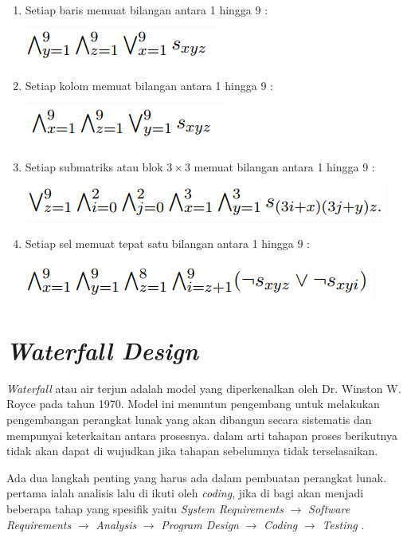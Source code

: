 \begin{enumerate}
	\item Setiap baris memuat bilangan antara 1 
	hingga 9 : 
	
	\includegraphics[scale=1]{gambar/rule1}
	
	\item Setiap kolom memuat bilangan antara 1 hingga 9 : 
	
	\includegraphics[scale=1]{gambar/rule2}
	
	\item Setiap submatriks atau blok $3 \times 3$
	memuat bilangan antara 1 hingga 9 : 
	
	\includegraphics[scale=1]{gambar/rule3}
	
	\item Setiap sel memuat tepat satu bilangan antara 1 hingga 9 : 
	
	\includegraphics[scale=1]{gambar/rule4}
	
\end{enumerate}


\section{\textit{Waterfall Design}}

\textit{Waterfall} atau air terjun adalah model yang diperkenalkan oleh Dr.
Winston W. Royce pada tahun 1970. Model ini menuntun pengembang untuk
melakukan pengembangan perangkat lunak yang akan dibangun secara sistematis
dan mempunyai keterkaitan antara prosesnya. dalam arti tahapan proses
berikutnya tidak akan dapat di wujudkan jika tahapan sebelumnya tidak
terselasaikan.

Ada dua langkah penting yang harus ada dalam pembuatan perangkat lunak. pertama ialah analisis lalu di ikuti oleh \textit{coding}, jika di bagi akan menjadi beberapa tahap yang spesifik yaitu \textit{System
Requirements} $\to$ \textit{Software Requirements} $\to$ \textit{Analysis} $\to$ \textit{Program Design} $\to$ \textit{Coding} $\to$ \textit{Testing} \cite{royce1987managing}. 

